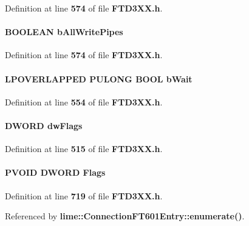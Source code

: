 Definition at line {\bf 574} of file {\bf F\+T\+D3\+X\+X.\+h}.

\paragraph[{b\+All\+Write\+Pipes}]{\setlength{\rightskip}{0pt plus 5cm}B\+O\+O\+L\+E\+AN b\+All\+Write\+Pipes}\label{FTD3XX_8h_ac647b09507822aab90cb917fc0f7fdd4}


Definition at line {\bf 574} of file {\bf F\+T\+D3\+X\+X.\+h}.

\paragraph[{b\+Wait}]{\setlength{\rightskip}{0pt plus 5cm}L\+P\+O\+V\+E\+R\+L\+A\+P\+P\+ED P\+U\+L\+O\+NG {\bf B\+O\+OL} b\+Wait}\label{FTD3XX_8h_a58b6995e25a3e1675a3f376baca2ced2}


Definition at line {\bf 554} of file {\bf F\+T\+D3\+X\+X.\+h}.

\paragraph[{dw\+Flags}]{\setlength{\rightskip}{0pt plus 5cm}D\+W\+O\+RD dw\+Flags}\label{FTD3XX_8h_a4d2f405b1141000eb2af256e0fc8b98b}


Definition at line {\bf 515} of file {\bf F\+T\+D3\+X\+X.\+h}.

\paragraph[{Flags}]{\setlength{\rightskip}{0pt plus 5cm}P\+V\+O\+ID D\+W\+O\+RD Flags}\label{FTD3XX_8h_a25f787b55c89400cbf67f7f135083127}


Definition at line {\bf 719} of file {\bf F\+T\+D3\+X\+X.\+h}.



Referenced by {\bf lime\+::\+Connection\+F\+T601\+Entry\+::enumerate()}.


